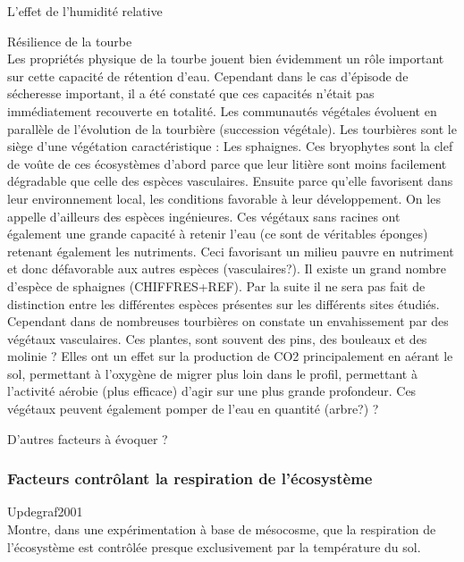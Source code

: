 L'effet de l'humidité relative \par

Résilience de la tourbe\\
Les propriétés physique de la tourbe jouent bien évidemment un rôle important sur cette capacité de rétention d'eau.
Cependant dans le cas d'épisode de sécheresse important, il a été constaté que ces capacités n'était pas immédiatement recouverte en totalité.
Les communautés végétales évoluent en parallèle de l'évolution de la tourbière (succession végétale).
Les tourbières sont le siège d'une végétation caractéristique : Les sphaignes.
Ces bryophytes sont la clef de voûte de ces écosystèmes d'abord parce que leur litière sont moins facilement dégradable que celle des espèces vasculaires.
Ensuite parce qu'elle favorisent dans leur environnement local, les conditions favorable à leur développement. 
On les appelle d'ailleurs des espèces ingénieures.
Ces végétaux sans racines ont également une grande capacité à retenir l'eau (ce sont de véritables éponges) retenant également les nutriments. 
Ceci favorisant un milieu pauvre en nutriment et donc défavorable aux autres espèces (vasculaires?).
Il existe un grand nombre d'espèce de sphaignes (CHIFFRES+REF).
Par la suite il ne sera pas fait de distinction entre les différentes espèces présentes sur les différents sites étudiés.
Cependant dans de nombreuses tourbières on constate un envahissement par des végétaux vasculaires.
Ces plantes, sont souvent des pins, des bouleaux et des molinie ?
Elles ont un effet sur la production de CO2 principalement en aérant le sol, permettant à l'oxygène de migrer plus loin dans le profil, permettant à l'activité aérobie (plus efficace) d'agir sur une plus grande profondeur.
Ces végétaux peuvent également pomper de l'eau en quantité (arbre?) ?


D'autres facteurs à évoquer ?


\subsubsection{Facteurs contrôlant la respiration de l'écosystème}
Updegraf2001\\
Montre, dans une expérimentation à base de mésocosme, que la respiration de l'écosystème est contrôlée presque exclusivement par la température du sol.

